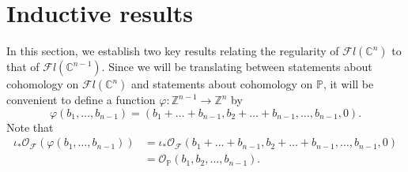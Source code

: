\documentclass[12pt,reqno]{amsart}
\theoremstyle{definition}
\theoremstyle{remark}
\newcommand{\calF}{{\mathcal{F}}}
\newcommand{\calO}{{\mathcal{O}}}
\begin{document}

\section{Inductive results}\label{sec:inductive}

In this section, we establish two key results relating the regularity of $\calF l(\mathbb C^n)$ to that of $\calF l(\mathbb C^{n-1})$.  Since we will be translating between statements about cohomology on $\calF l(\mathbb C^n)$ and statements about cohomology on $\mathbb P$, it will be convenient to define a function $\varphi: \mathbb Z^{n-1}\rightarrow \mathbb Z^n$ by
\begin{equation}\label{eqn:varphi}
    \varphi(b_1,\ldots,b_{n-1}) = (b_1+\ldots+b_{n-1},b_2+\ldots+b_{n-1},\ldots,b_{n-1},0).
\end{equation}
Note that
\begin{align*}
    \iota_*\calO_{\calF}(\varphi(b_1,\ldots,b_{n-1}))&= \iota_*\calO_{\calF}(b_1+\ldots+b_{n-1},b_2+\ldots+b_{n-1},\ldots,b_{n-1},0)\\
    &= \calO_{\mathbb P}(b_1,b_2,\ldots,b_{n-1}).
\end{align*}
\end{document}

